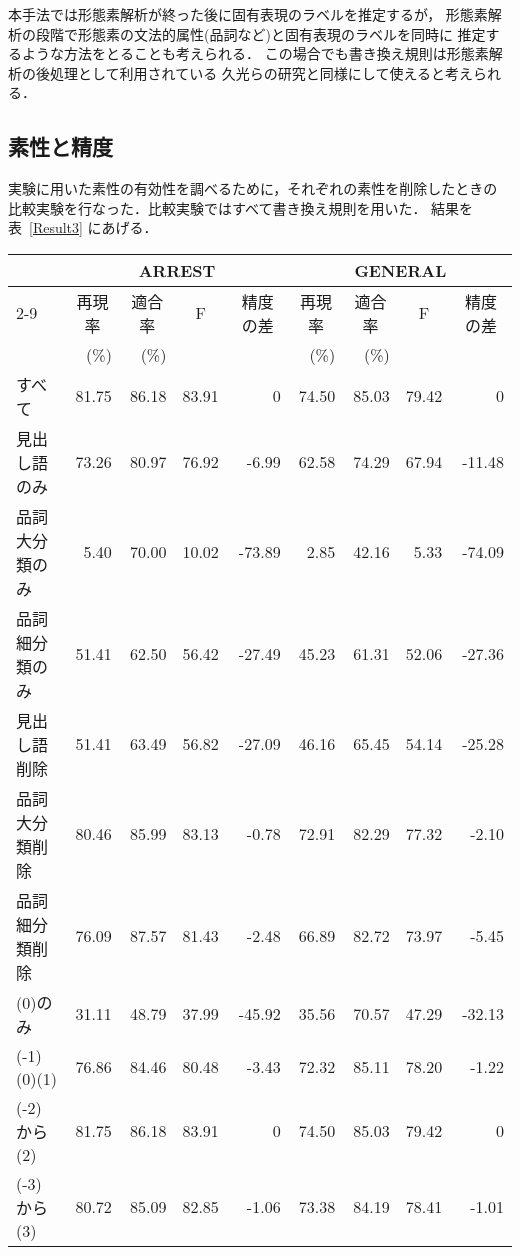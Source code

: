 本手法では形態素解析が終った後に固有表現のラベルを推定するが，
形態素解析の段階で形態素の文法的属性(品詞など)と固有表現のラベルを同時に
推定するような方法をとることも考えられる．
この場合でも書き換え規則は形態素解析の後処理として利用されている
久光らの研究\cite{Hisamitsu:98}と同様にして使えると考えられる．

\subsection{素性と精度}
\label{sec:features_and_accuracy}

実験に用いた素性の有効性を調べるために，それぞれの素性を削除したときの
比較実験を行なった．比較実験ではすべて書き換え規則を用いた．
結果を表~\ref{Result3} にあげる．
{\small
\begin{table*}[thbp]
  \begin{center}
    \caption{素性と精度の関係(書き換え規則利用)}
    \label{Result3} 
    \begin{tabular}{|l|r@{ }rr@{ }r|r@{ }rr@{ }r|}
      \hline
      & \multicolumn{4}{c|}{ARREST} 
      & \multicolumn{4}{c|}{GENERAL}\\
      \cline{2-9}
      \multicolumn{1}{|c|}{素性} & \multicolumn{1}{c}{再現率} 
      & \multicolumn{1}{c}{適合率} & \multicolumn{1}{c}{F} 
      & \multicolumn{1}{c|}{精度の差}
      & \multicolumn{1}{c}{再現率} & \multicolumn{1}{c}{適合率} 
      & \multicolumn{1}{c}{F} & \multicolumn{1}{c|}{精度の差} \\
      & (\%) & (\%) & & & (\%) & (\%) & &\\
      \hline      
      すべて & 81.75 & 86.18 & 83.91 & 0 & 74.50 & 85.03 & 79.42 & 0\\
      見出し語のみ & 73.26 & 80.97 & 76.92 & -6.99
      & 62.58 & 74.29 & 67.94 & -11.48\\
      品詞大分類のみ & 5.40 & 70.00 & 10.02 & -73.89
      & 2.85 & 42.16 & 5.33 & -74.09\\
      品詞細分類のみ & 51.41 & 62.50 & 56.42 & -27.49
      & 45.23 & 61.31 & 52.06 & -27.36\\
      見出し語削除 & 51.41 & 63.49 & 56.82 & -27.09
      & 46.16 & 65.45 & 54.14 & -25.28\\
      品詞大分類削除 & 80.46 & 85.99 & 83.13 & -0.78
      & 72.91 & 82.29 & 77.32 & -2.10\\
      品詞細分類削除 & 76.09 & 87.57 & 81.43 & -2.48
      & 66.89 & 82.72 & 73.97 & -5.45\\
      \hline
      (0)のみ & 31.11 & 48.79 & 37.99 & -45.92
      & 35.56 & 70.57 & 47.29 & -32.13\\
      (-1)(0)(1) & 76.86 & 84.46 & 80.48 & -3.43
      & 72.32 & 85.11 & 78.20 & -1.22\\
      (-2)から(2) 
      & 81.75 & 86.18 & 83.91 & 0 & 74.50 & 85.03 & 79.42 & 0\\
      (-3)から(3) & 80.72 & 85.09 & 82.85 & -1.06
      & 73.38 & 84.19 & 78.41 & -1.01\\
      \hline
    \end{tabular}
  \end{center}
\end{table*}
}
